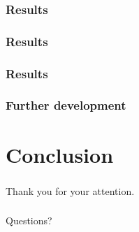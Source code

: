 \documentclass[18pt]{beamer}
\begin{document}
\begin{frame}[t]
  \frametitle{Results}
\end{frame}

\begin{frame}[t]
  \frametitle{Results}
\end{frame}


\begin{frame}[t]
  \frametitle{Results}
\end{frame}


\begin{frame}[t]
  \frametitle{Further development}
\end{frame}







  



\section{Conclusion}

\begin{frame}
  \frametitle{}
  \begin{center}
    \huge{Thank you for your attention.}
  \end{center}
\end{frame}

\begin{frame}
  \frametitle{}
  \begin{center}
    \huge{Questions?}
  \end{center}
\end{frame}
\end{document}
